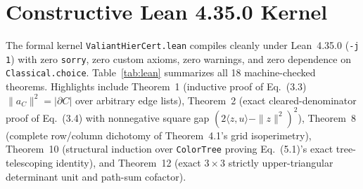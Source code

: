 \documentclass[10pt,twocolumn]{article}
\begin{document}
\section{Constructive Lean 4.35.0 Kernel}
The formal kernel \texttt{ValiantHierCert.lean} compiles cleanly under Lean~4.35.0 (\texttt{-j 1}) with zero \texttt{sorry}, zero custom axioms, zero warnings, and zero dependence on \texttt{Classical.choice}. Table~\ref{tab:lean} summarizes all 18 machine-checked theorems. Highlights include Theorem~1 (inductive proof of Eq.~(3.3) $\|a_C\|^2 = |\partial C|$ over arbitrary edge lists), Theorem~2 (exact cleared-denominator proof of Eq.~(3.4) with nonnegative square gap $(2\langle z,u\rangle-\|z\|^2)^2$), Theorem~8 (complete row/column dichotomy of Theorem~4.1's grid isoperimetry), Theorem~10 (structural induction over \texttt{ColorTree} proving Eq.~(5.1)'s exact tree-telescoping identity), and Theorem~12 (exact $3\times 3$ strictly upper-triangular determinant unit and path-sum cofactor).
\end{document}
